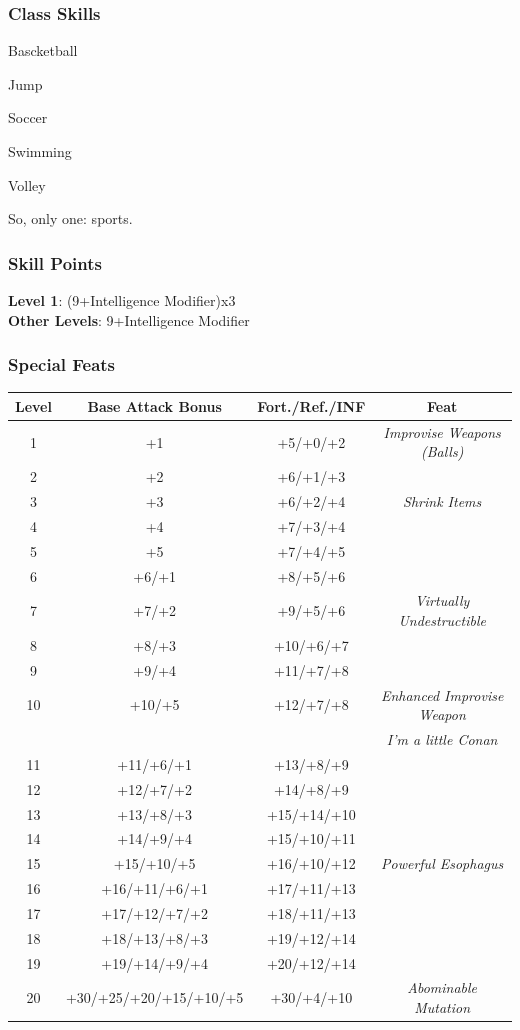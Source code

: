 \documentclass[ letterpaper,12pt]{article}
\begin{document}
\subsubsection{Class Skills}
\begin{itemize}
{\it 
\item{Bascketball}
\item{Jump}
\item{Soccer}
\item{Swimming}
\item{Volley}
\item{So, only one: sports.}
}
\end{itemize}

\subsubsection{Skill Points}
{\bf Level 1}: (9+Intelligence Modifier)x3\\
{\bf Other Levels}: 9+Intelligence Modifier\\

\subsubsection{Special Feats}

\begin{center} \begin{tabular}{|c||c|c|c|}
\hline
{\bf Level}&{\bf Base Attack Bonus}&{\bf Fort./Ref./INF}&{\bf Feat}\\
\hline
1&+1&+5/+0/+2&{\it Improvise Weapons (Balls)}\\
\hline
2&+2&+6/+1/+3&\\
\hline
3&+3&+6/+2/+4&{\it Shrink Items}\\
\hline
4&+4&+7/+3/+4&\\
\hline
5&+5&+7/+4/+5&\\
\hline
6&+6/+1&+8/+5/+6&\\
\hline
7&+7/+2&+9/+5/+6&{\it Virtually Undestructible}\\
\hline
8&+8/+3&+10/+6/+7&\\
\hline
9&+9/+4&+11/+7/+8&\\
\hline
10&+10/+5&+12/+7/+8&{\it Enhanced Improvise Weapon}\\
  &      &         &{\it I'm a little Conan}\\
\hline
11&+11/+6/+1&+13/+8/+9&\\
\hline
12&+12/+7/+2&+14/+8/+9&\\
\hline
13&+13/+8/+3&+15/+14/+10&\\
\hline
14&+14/+9/+4&+15/+10/+11&\\
\hline
15&+15/+10/+5&+16/+10/+12&{\it Powerful Esophagus}\\
\hline
16&+16/+11/+6/+1&+17/+11/+13&\\
\hline
17&+17/+12/+7/+2&+18/+11/+13&\\
\hline
18&+18/+13/+8/+3&+19/+12/+14&\\
\hline
19&+19/+14/+9/+4&+20/+12/+14&\\
\hline
20&+30/+25/+20/+15/+10/+5&+30/+4/+10&{\it Abominable Mutation}\\
\hline
\end{tabular} \end{center}
\end{document}
